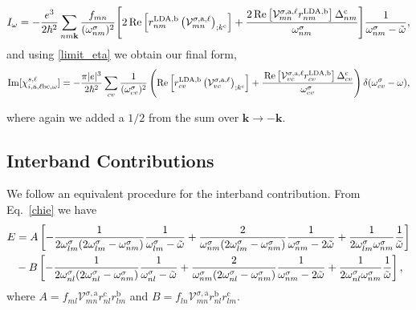 \begin{equation}\label{wchii_simplified}
I_{\omega}
=   -\frac{e^3}{2\hbar^2}\sum_{nm\mathbf{k}}
    \frac{f_{mn}}{(\omega^{\sigma}_{nm})^{2}}
\Biggl[
    2\,\mathrm{Re}\left[r^{\text{LDA,b}}_{nm}
    \left(\mathcal{V}^{\sigma,\text{a},\ell}_{mn}\right)_{;k^{\text{c}}}\right]
+   \frac{2\,\mathrm{Re}\left[\mathcal{V}^{\sigma,\text{a},\ell}_{mn}
    r^{\text{LDA,b}}_{nm}\right]\Delta^{\text{c}}_{nm}}{\omega^{\sigma}_{nm}} 
\Biggr]\frac{1}{\omega^{\sigma}_{nm}-\tilde\omega}
,
\end{equation}
and using \eqref{limit_eta} we obtain our final form,
\begin{equation}
\mathrm{Im}[\chi_{i,\text{a},\ell\text{b}\text{c},\omega}^{s,\ell}]
=   -\frac{\pi\vert e\vert^3}{2\hbar^2}
    \sum_{cv}\frac{1}{(\omega^{\sigma}_{cv})^{2}}
\left(
    \mathrm{Re}\left[r^{\text{LDA,b}}_{cv}
    \left(\mathcal{V}^{\sigma,\text{a},\ell}_{vc}\right)_{;k^{\text{c}}}\right]
+   \frac{\,\mathrm{Re}\left[\mathcal{V}^{\sigma,\text{a},\ell}_{vc}
    r^{\text{LDA,b}}_{cv}\right]\Delta^{\text{c}}_{cv}}{\omega^{\sigma}_{cv}} 
\right)\delta(\omega^{\sigma}_{cv}-\omega)
,
\end{equation}

where again we added a $1/2$ from the sum over 
$\mathbf{k} \rightarrow - \mathbf{k}$.

\subsection{Interband Contributions}

We follow an equivalent procedure for the interband contribution. 
From Eq.~\eqref{chie} we have
\begin{align}\label{ewithaandb}  
E&=  
A
\left[
-\frac{1}{2\omega^\sigma_{lm}(2\omega^\sigma_{lm}-\omega^\sigma_{nm})}\frac{1}{\omega^\sigma_{lm}-\tilde\omega}
+\frac{2}{\omega^\sigma_{nm}(2\omega^\sigma_{lm}-\omega^\sigma_{nm})}\frac{1}{\omega^\sigma_{nm}-2\tilde\omega}
+\frac{1}{2\omega^\sigma_{lm}\omega^\sigma_{nm}}\frac{1}{\tilde\omega}
\right]
\nonumber\\
&- 
B
\left[
-\frac{1}{2\omega^\sigma_{nl}(2\omega^\sigma_{nl}-\omega^\sigma_{nm})}\frac{1}{\omega^\sigma_{nl}-\tilde\omega}
+\frac{2}{\omega^\sigma_{nm}(2\omega^\sigma_{nl}-\omega^\sigma_{nm})}\frac{1}{\omega^\sigma_{nm}-2\tilde\omega}
+\frac{1}{2\omega^\sigma_{nl}\omega^\sigma_{nm}}\frac{1}{\tilde\omega}
\right]
,
\end{align}  
where 
$A=f_{ml}\mathcal{V}^{\sigma,\text{a}}_{mn}r^{\text{c}}_{nl}r^{\text{b}}_{lm}$   
and
$B=f_{ln}\mathcal{V}^{\sigma,\text{a}}_{mn}r^{\text{b}}_{nl}r^{\text{c}}_{lm}$.

